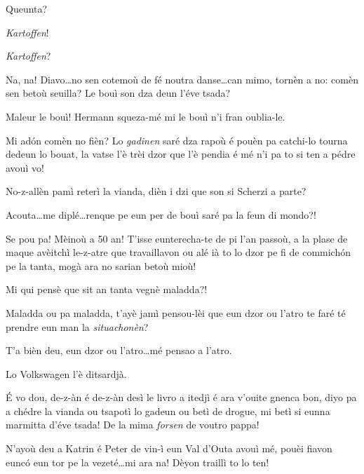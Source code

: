 \begin{drama}
\Cesarspeaks Queunta?

\Hermannspeaks \textit{Kartoffen}!

\Katrinspeaks \textit{Kartoffen}?


\Hermannspeaks{} Na, na!  Diavo\ldots no sen cotemoù de fé noutra danse\ldots can mimo, tornèn a no: comèn sen betoù seuilla? Le bouì son dza deun l'éve tsada?

\Cesarspeaks Maleur le bouì! Hermann squeza-mé mi le bouì n'i fran oublia-le.

\Hermannspeaks{} Mi ad\'on comèn no fièn? Lo \textit{gadinen} saré dza rapoù é pouèn pa catchi-lo tourna dedeun lo bouat, la vatse l'è trèi dzor que l'è pendia é mé n'i pa to si ten a pédre avouì vo! 


\Hermannspeaks{} No-z-allèn pamì reterì la vianda, dièn i dzi que son si \og Scherzi a parte\fg ?

\Cesarspeaks {} Acouta\ldots me diplé\ldots renque pe eun per de bouì saré pa la feun di mondo?!

\Hermannspeaks Se pou pa! Mèinoù a 50 an! T’isse eunterecha-te de pi l'an passoù, a la plase de maque avèitchì le-z-atre que travaillavon ou alé ià to lo dzor pe fi de commich\'on pe la tanta, mogà ara no sarian betoù mioù!

\Cesarspeaks Mi qui pensè que sit an tanta vegnè maladda?!

\Hermannspeaks{} Maladda ou pa maladda, t'ayè jamì pensou-lèi que eun dzor ou l’atro te faré té prendre eun man la \textit{situachonèn}? 

\Cesarspeaks T'a bièn deu, eun dzor ou l'atro\ldots mé pensao a l'atro.


\Remyspeaks Lo Volkswagen l'è ditsardjà.

\Hermannspeaks{} \'E vo dou, de-z-àn é de-z-àn desì le livro a itedjì é ara v'ouite gnenca bon, diyo pa a chédre la vianda ou tsapotì lo gadeun ou betì de drogue, mi betì si eunna marmitta d’éve tsada! De la mima \textit{forsen} de voutro pappa!

\Hermannspeaks{} N'ayoù deu a Katrin é Peter de vin-ì eun Val d'Outa avouì mé, pouèi fiavon eunc\'o eun tor pe la vezeté\ldots mi ara na! Dèyon traillì to lo ten!


\end{drama}
